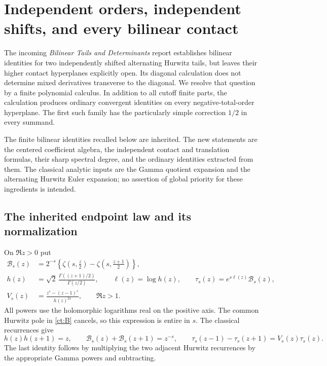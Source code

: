 \section{Independent orders, independent shifts, and every bilinear contact}
\label{ct:section}

The incoming \emph{Bilinear Tails and Determinants} report establishes
bilinear identities for two independently shifted alternating Hurwitz tails\cite{ProveItBilinear},
but leaves their higher contact hyperplanes explicitly open. Its diagonal
calculation does not determine mixed derivatives transverse to the diagonal.
We resolve that question by a finite polynomial calculus. In addition to
all cutoff finite parts, the calculation produces ordinary convergent
identities on every negative-total-order hyperplane. The first such family
has the particularly simple correction $1/2$ in every summand.

The finite bilinear identities recalled below are inherited. The new
statements are the centered coefficient algebra, the independent contact
and translation formulas, their sharp spectral degree, and the ordinary
identities extracted from them. The classical analytic inputs are the
Gamma quotient expansion and the alternating Hurwitz Euler expansion;
no assertion of global priority for these ingredients is intended.

\subsection{The inherited endpoint law and its normalization}

On $\Re z>0$ put
\begin{align}
 \mathcal B_s(z)&=2^{-s}\left\{\zeta\left(s,\frac z2\right)
              -\zeta\left(s,\frac{z+1}{2}\right)\right\},
                   \label{ct:B}\\
 h(z)&=\sqrt2\,\frac{\Gamma((z+1)/2)}{\Gamma(z/2)},
 \qquad \ell(z)=\log h(z),\qquad
 \tau_s(z)=e^{s\ell(z)}\mathcal B_s(z),\label{ct:tau}\\
 V_s(z)&=\frac{z^s-(z-1)^s}{h(z)^{2s}},\qquad \Re z>1.
                   \label{ct:V}
\end{align}
All powers use the holomorphic logarithms real on the positive axis.
The common Hurwitz pole in \eqref{ct:B} cancels, so this expression is
entire in $s$. The classical recurrences give
\begin{equation}\label{ct:recurrences}
 h(z)h(z+1)=z,\qquad
 \mathcal B_s(z)+\mathcal B_s(z+1)=z^{-s},\qquad
 \tau_s(z-1)-\tau_s(z+1)=V_s(z)\tau_s(z).
\end{equation}
The last identity follows by multiplying the two adjacent Hurwitz
recurrences by the appropriate Gamma powers and subtracting.

